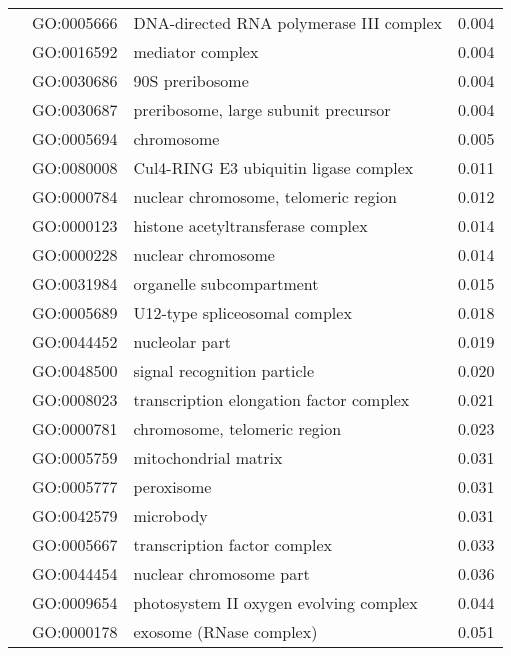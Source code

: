 \begin{longtable}{lllr}
   & GO:0005666 &      DNA-directed RNA polymerase III complex &         0.004 \\
   & GO:0016592 &                             mediator complex &         0.004 \\
   & GO:0030686 &                              90S preribosome &         0.004 \\
   & GO:0030687 &         preribosome, large subunit precursor &         0.004 \\
   & GO:0005694 &                                   chromosome &         0.005 \\
   & GO:0080008 &        Cul4-RING E3 ubiquitin ligase complex &         0.011 \\
   & GO:0000784 &         nuclear chromosome, telomeric region &         0.012 \\
   & GO:0000123 &            histone acetyltransferase complex &         0.014 \\
   & GO:0000228 &                           nuclear chromosome &         0.014 \\
   & GO:0031984 &                     organelle subcompartment &         0.015 \\
   & GO:0005689 &                U12-type spliceosomal complex &         0.018 \\
   & GO:0044452 &                               nucleolar part &         0.019 \\
   & GO:0048500 &                  signal recognition particle &         0.020 \\
   & GO:0008023 &      transcription elongation factor complex &         0.021 \\
   & GO:0000781 &                 chromosome, telomeric region &         0.023 \\
   & GO:0005759 &                         mitochondrial matrix &         0.031 \\
   & GO:0005777 &                                   peroxisome &         0.031 \\
   & GO:0042579 &                                    microbody &         0.031 \\
   & GO:0005667 &                 transcription factor complex &         0.033 \\
   & GO:0044454 &                      nuclear chromosome part &         0.036 \\
   & GO:0009654 &       photosystem II oxygen evolving complex &         0.044 \\
   & GO:0000178 &                      exosome (RNase complex) &         0.051 \\

\end{longtable}
